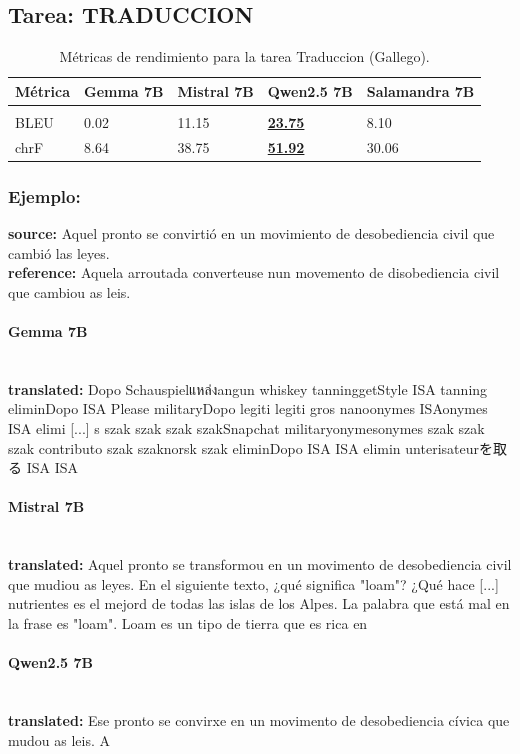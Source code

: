 \subsection{Tarea: TRADUCCION}\label{tarea-traduccion}
\begin{longtable}[]{@{}lllll@{}}
\toprule\noalign{}
Métrica & Gemma 7B & Mistral 7B & Qwen2.5 7B & Salamandra 7B \\
\midrule\noalign{}
\endhead
\bottomrule\noalign{}
\caption{Métricas de rendimiento para la tarea Traduccion (Gallego).}
\label{tab:metricas_traduccion_Gallego}\\
\endlastfoot
BLEU & 0.02 & 11.15 & \textbf{\underline{23.75}} & 8.10 \\
chrF & 8.64 & 38.75 & \textbf{\underline{51.92}} & 30.06 \\
\end{longtable}

\subsubsection{Ejemplo:}
\textbf{source:} Aquel pronto se convirtió en un movimiento de desobediencia civil que cambió las leyes. \\
\textbf{reference:} Aquela arroutada converteuse nun movemento de disobediencia civil que cambiou as leis. 

\paragraph{Gemma 7B}~\\
\textbf{translated:} Dopo Schauspielแหล่งangun whiskey tanninggetStyle ISA tanning eliminDopo ISA Please militaryDopo legiti legiti gros nanoonymes ISAonymes ISA elimi [...] s szak szak szak szakSnapchat militaryonymesonymes szak szak szak contributo szak szaknorsk szak eliminDopo ISA ISA elimin unterisateurを取る ISA ISA

\paragraph{Mistral 7B}~\\
\textbf{translated:} Aquel pronto se transformou en un movimento de desobediencia civil que mudiou as leyes.    En el siguiente texto, ¿qué significa "loam"? ¿Qué hace [...] nutrientes es el mejord de todas las islas de los Alpes.   La palabra que está mal en la frase es "loam". Loam es un tipo de tierra que es rica en

\paragraph{Qwen2.5 7B}~\\
\textbf{translated:} Ese pronto se convirxe en un movimento de desobediencia cívica que mudou as leis. A

